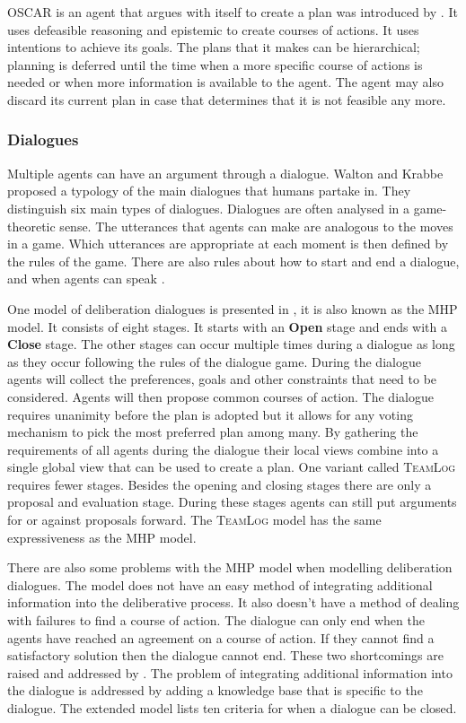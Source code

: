 OSCAR is an agent that argues with itself to create a plan was introduced by 
\cite{pollock1995}. It uses defeasible reasoning and epistemic to create 
courses of actions. It uses intentions to achieve its goals. The plans that it 
makes can be hierarchical; planning is deferred until the time when a more 
specific course of actions is needed or when more information is available to 
the agent. The agent may also discard its current plan in case that determines 
that it is not feasible any more.

\subsubsection{Dialogues}
Multiple agents can have an argument through a dialogue. Walton and
Krabbe \citep{walton1995} proposed a typology of the main dialogues that humans
partake in. They distinguish six main types of dialogues. Dialogues are often 
analysed in a game-theoretic sense. The utterances that agents can make are 
analogous to the moves in a game. Which utterances are appropriate at each 
moment is then defined by the rules of the game. There are also rules about how 
to start and end a dialogue, and when agents can speak 
\citep{prakken2006,prakken2009,mcburney2009}. 

One model of deliberation dialogues is presented in \citep{mcburney2007}, it is
also known as the MHP model. It
consists of eight stages. It starts with an \textbf{Open} stage and ends with
a \textbf{Close} stage. The other stages can occur multiple times during a
dialogue as long as they occur following the rules of the dialogue game.
During the dialogue agents will collect the preferences, goals and other
constraints that need to be considered. Agents will then propose common courses
of action. The dialogue requires unanimity before the plan is adopted but it 
allows for any voting mechanism to pick the most preferred plan among many. By 
gathering the requirements of all agents during the dialogue their local views 
combine into a single global view that can be used to create a plan. One 
variant called \textsc{TeamLog} \citep{dunin-keplicz2011} requires fewer 
stages. 
Besides the opening and closing stages there are only a proposal and evaluation 
stage. During these stages agents can still put arguments for or against 
proposals forward. The \textsc{TeamLog} model has the same expressiveness as 
the MHP model.

There are also some problems with the MHP model when modelling
deliberation dialogues. The model does not have an easy method of integrating
additional information into the deliberative process. It also doesn't have a
method of dealing with failures to find a course of action. The dialogue can 
only end when the agents have reached an agreement on a course of action. If 
they cannot find a satisfactory solution then the dialogue cannot end. These 
two shortcomings are raised and addressed by \citep{walton2014}. The problem of 
integrating additional information into the dialogue is addressed by adding a 
knowledge base that is specific to the dialogue. The extended model lists ten
criteria for when a dialogue can be closed.


